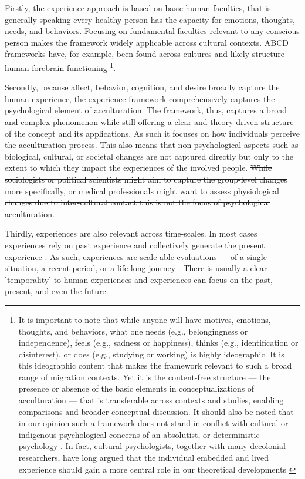 \documentclass[nobib]{tufte-handout}
\begin{document}
Firstly, the experience approach is based on basic human faculties, that is generally speaking every healthy person has the capacity for emotions, thoughts, needs, and behaviors. Focusing on fundamental faculties relevant to any conscious person makes the framework widely applicable across cultural contexts. ABCD frameworks have, for example, been found across cultures \citep[e.g.,][]{Bhawuk2011} and likely structure human forebrain functioning \citep{Swanson2020}\footnote{It is important to note that while anyone will have motives, emotions, thoughts, and behaviors, what one needs (e.g., belongingness or independence), feels (e.g., sadness or happiness), thinks (e.g., identification or disinterest), or does (e.g., studying or working) is highly ideographic. It is this ideographic content that makes the framework relevant to such a broad range of migration contexts. Yet it is the content-free structure --- the presence or absence of the basic elements in conceptualizations of acculturation --- that is transferable across contexts and studies, enabling comparisons and broader conceptual discussion. It should also be noted that in our opinion such a framework does not stand in conflict with cultural or indigenous psychological concerns of an absolutist, or deterministic psychology \citep[e.g.,][]{Kim2006a}. In fact, cultural psychologists, together with many decolonial researchers, have long argued that the individual embedded and lived experience should gain a more central role in our theoretical developments \citep[e.g., ontological turn;][]{Pedersen2020}}.

Secondly, because affect, behavior, cognition, and desire broadly capture the human experience, the experience framework comprehensively captures the psychological element of acculturation. The framework, thus, captures a broad and complex phenomenon while still offering a clear and theory-driven structure of the concept and its applications. 
As such it focuses on how individuals perceive the acculturation process. This also means that non-psychological aspects such as biological, cultural, or societal changes are not captured directly but only to the extent to which they impact the experiences of the involved people. \sout{While sociologists or political scientists might aim to capture the group-level changes more specifically, or medical professionals might want to assess physiological changes due to inter-cultural contact this is not the focus of psychological acculturation.} 

Thirdly, experiences are also relevant across time-scales. In most cases experiences rely on past experience and collectively generate the present experience \citep[also see][]{Husserl1959, Heidegger1867}. As such, experiences are scale-able evaluations --- of a single situation, a recent period, or a life-long journey \citep[e.g.,][]{Clewett2019}. There is usually a clear 'temporality' to human experiences and experiences can focus on the past, present, and even the future.
\end{document}
